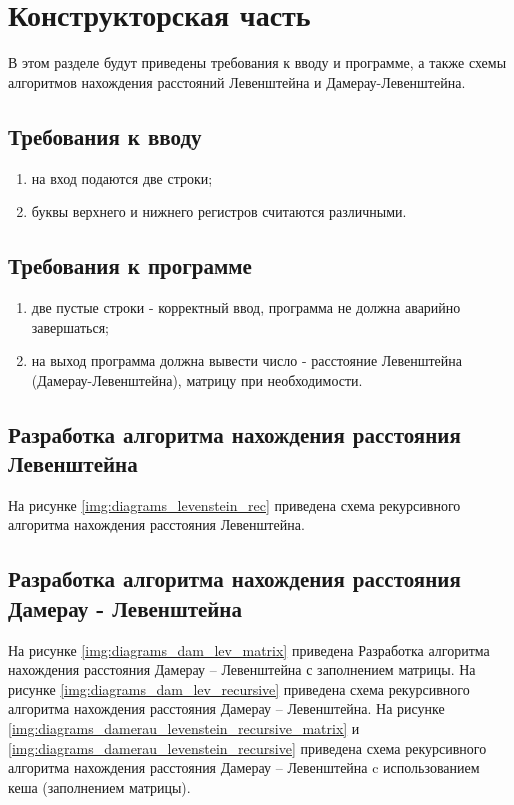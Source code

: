 \chapter{Конструкторская часть}
В этом разделе будут приведены требования к вводу и программе, а также схемы алгоритмов нахождения расстояний Левенштейна и Дамерау-Левенштейна.

\section{Требования к вводу}
\begin{enumerate}[label={\arabic*)}]
	\item на вход подаются две строки;
	\item буквы верхнего и нижнего регистров считаются различными.
\end{enumerate}

\section{Требования к программе}
\begin{enumerate}[label={\arabic*)}]
	\item две пустые строки - корректный ввод, программа не должна аварийно завершаться;
	\item на выход программа должна вывести число - расстояние Левенштейна (Дамерау-Левенштейна), матрицу при необходимости.
\end{enumerate}

\section{Разработка алгоритма нахождения расстояния Левенштейна}

На рисунке \ref{img:diagrams_levenstein_rec} приведена схема рекурсивного алгоритма нахождения расстояния Левенштейна.

\section{Разработка алгоритма нахождения расстояния Дамерау - Левенштейна}

На рисунке \ref{img:diagrams_dam_lev_matrix} приведена Разработка алгоритма нахождения расстояния Дамерау -- Левенштейна с заполнением матрицы.
На рисунке \ref{img:diagrams_dam_lev_recursive} приведена схема рекурсивного алгоритма нахождения расстояния Дамерау -- Левенштейна.
На рисунке \ref{img:diagrams_damerau_levenstein_recursive_matrix} и \ref{img:diagrams_damerau_levenstein_recursive} приведена схема рекурсивного алгоритма нахождения расстояния Дамерау -- Левенштейна c использованием кеша (заполнением матрицы).

